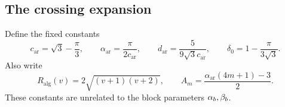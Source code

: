 \subsection{The crossing expansion}

Define the fixed constants
\begin{equation}\label{inf:arithmetic-constants}
 c_{\mathrm{ar}}=\sqrt3-\frac\pi3,
 \qquad \alpha_{\mathrm{ar}}=\frac\pi{2c_{\mathrm{ar}}},
 \qquad d_{\mathrm{ar}}=\frac5{9\sqrt3c_{\mathrm{ar}}},
 \qquad \delta_0=1-\frac\pi{3\sqrt3}.
\end{equation}
Also write
\begin{equation}\label{inf:algebraic-radius}
 R_{\mathrm{alg}}(v)=2\sqrt{(v+1)(v+2)},\qquad
 A_m=\frac{\alpha_{\mathrm{ar}}(4m+1)-3}{2}.
\end{equation}
These constants are unrelated to the block parameters $\alpha_b,\beta_b$.

